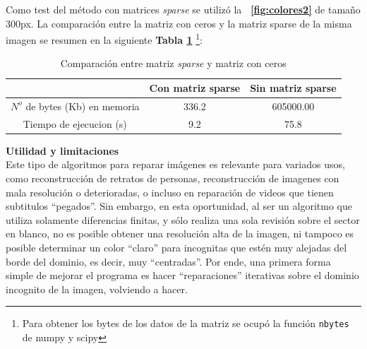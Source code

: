 \documentclass[letterpaper,10.7pt]{article}
\newcommand{\figref}[1]{\figurename~\ref{#1}}
\begin{document}
Como test del método con matrices \textit{sparse} se utilizó la \textbf{\figref{fig:colores2}} de tamaño 300px. La comparación entre la matriz con ceros y la matriz sparse de la misma imagen se resumen en la siguiente \textbf{Tabla \ref{tab:compare}} \footnote{Para obtener los bytes de los datos de la matriz se ocupó la función \texttt{nbytes} de numpy y scipy}:

\begin{table}[htbp]
  \centering
    \begin{tabular}{|c|c|c|}
    \hline
    \multicolumn{1}{|c|}{} & Con matriz sparse & Sin matriz sparse \\
    \hline
    $N^{o}$ de bytes (Kb) en memoria & 336.2 & 605000.00  \\
    \hline
    Tiempo de ejecucion (s) & 9.2   & 75.8 \\
    \hline
    \end{tabular}
   \caption{Comparación entre matriz \textit{sparse} y matriz con ceros}
  \label{tab:compare}
\end{table}

{\centering \textbf{{\Large Utilidad y limitaciones}}}\\

Este tipo de algoritmos para reparar imágenes es relevante para variados usos, como reconstrucción de retratos de personas, reconstrucción de imagenes con mala resolución o deterioradas, o incluso en reparación de videos que tienen subtitulos ``pegados''. Sin embargo, en esta oportunidad, al ser un algoritmo que utiliza solamente diferencias finitas, y sólo realiza una sola revisión sobre el sector en blanco, no es posible obtener una resolución alta de la imagen, ni tampoco es posible determinar un color ``claro'' para incognitas que estén muy alejadas del borde del dominio, es decir, muy ``centradas''. Por ende, una primera forma simple de mejorar el programa es hacer ``reparaciones'' iterativas sobre el dominio incognito de la imagen, volviendo a hacer.
\end{document}
